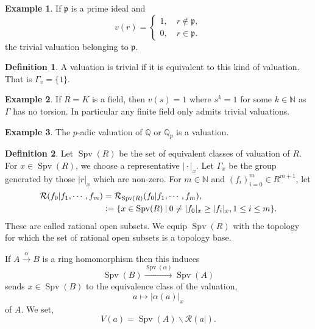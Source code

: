 \documentclass[10pt]{article}
\numberwithin{equation}{section}
\theoremstyle{definition}
\newtheorem{definition}{Definition}[subsection]
\newtheorem{example}{Example}[subsection]
\DeclareMathOperator{\Spv}{Spv}
\newcommand{\defeq}{\vcentcolon=}
\newcommand{\N}[0]{\mathbb{N}}
\newcommand{\Q}[0]{\mathbb{Q}}
\newcommand{\sep}[0]{\:|\:}
\newcommand{\p}[0]{\mathfrak{p}}
\begin{document}
\begin{example}
    If $\p$ is a prime ideal and
    \begin{equation*}
        v(r) = \begin{cases}
            1,\quad r\not\in\p,\\
            0,\quad r\in\p.
        \end{cases}
    \end{equation*}
    the trivial valuation belonging to $\p$.
    \label{example_5_1}
\end{example}
\begin{definition}
    A valuation is trivial if it is equivalent to this kind of valuation. That is $\Gamma_v=\{1\}$.
\end{definition}
\begin{example}
    \label{example_5_2}
    If $R=K$ is a field, then $v(s) = 1$ where $s^k=1$ for some $k\in\N$ as $\Gamma$ has no torsion. In particular any finite field only admits trivial valuations.
\end{example}
\begin{example}
    \label{example_5_3}
    The $p$-adic valuation of $\Q$ or $\Q_p$ is a valuation.
\end{example}
\begin{definition}
    \label{definition_5_5}
    Let $\Spv(R)$ be the set of equivalent classes of valuation of $R$. For $x\in\Spv(R)$, we choose a representative $\vert\cdot\vert_x$.
    Let $\Gamma_x$  be the group generated by those $\vert r\vert_x$ which are non-zero. For $m\in\N$ and $(f_i)_{i=0}^m\in R^{m+1}$, let
    \begin{align*}
        \mathcal{R}(f_0|f_1,\cdots,f_m)& =\mathcal{R}_{\Spv(R)}(f_0|f_1,\cdots,f_m),\\
        &\defeq \{x\in\Spv(R)\sep 0\not=\vert f_0\vert_x\geq\vert f_i\vert_x, 1\leq i\leq m\}.
    \end{align*}
    These are called rational open subsets. We equip $\Spv(R)$ with the topology for which the set of rational open subsets is a topology base.
    \par If $A\stackrel{\alpha}{\to}B$ is a ring homomorphism then this induces
    \begin{equation*}
        \Spv(B)\stackrel{\Spv(\alpha)}{\to}\Spv(A)
    \end{equation*}
    sends $x\in\Spv(B)$ to the equivalence class of the valuation,
    \begin{equation*}
        a\mapsto\vert\alpha(a)\vert_x
    \end{equation*}
    of $A$. We set,
    \begin{equation*}
        V(a) = \Spv(A)\backslash \mathcal{R}(a|).
    \end{equation*}
\end{definition}
\end{document}
